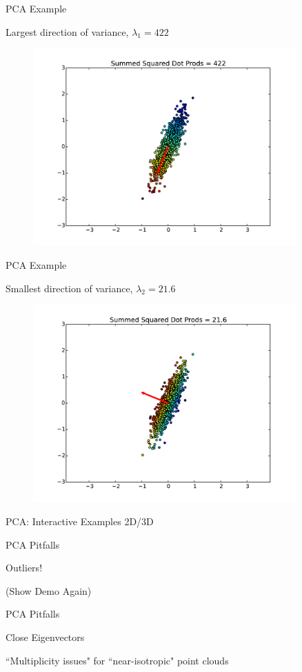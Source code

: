 \documentclass{beamer}
\begin{document}
\begin{frame}{PCA Example}

Largest direction of variance, $\lambda_1 = 422$

\begin{figure}[t]
    \centering
	\includegraphics[width=0.9\textwidth]{2DPCADir6.pdf}
\end{figure}


\end{frame}

\begin{frame}{PCA Example}

Smallest direction of variance, $\lambda_2 = 21.6$

\begin{figure}[t]
    \centering
	\includegraphics[width=0.9\textwidth]{2DPCADir5.pdf}
\end{figure}


\end{frame}


\begin{frame}{PCA: Interactive Examples 2D/3D}

\end{frame}


\begin{frame}{PCA Pitfalls}

Outliers!

(Show Demo Again)
\end{frame}


\begin{frame}{PCA Pitfalls}


Close Eigenvectors

``Multiplicity issues" for ``near-isotropic" point clouds


\end{frame}
\end{document}
